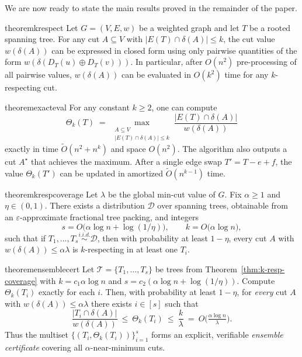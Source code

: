 \documentclass[11pt,letterpaper]{article}
\begin{document}
We are now ready to state the main results proved in the remainder of the paper.

\begin{restatable}{theorem}{krespect}
\label{thm:krespect}
Let $G=(V,E, w)$ be a weighted graph and let $T$ be a rooted spanning tree.  
For any cut $A \subseteq V$ with $|E(T)\cap \delta(A)| \le k$, the cut value
$w(\delta(A))$ can be expressed in closed form using only
pairwise quantities of the form $w(\delta(D_T(u)\oplus D_T(v)))$.
In particular, after $O(n^2)$ pre-processing of all pairwise values,
$w(\delta(A))$ can be evaluated in $O(k^2)$ time for any $k$-respecting cut.
\end{restatable}

\begin{restatable}{theorem}{exacteval}
\label{thm:exact-eval}
For any constant $k \ge 2$, one can compute
\[
\Theta_k(T) \;=\; \max_{\substack{A \subseteq V \\ |E(T)\cap \delta(A)| \le k}}
\frac{|E(T)\cap \delta(A)|}{w(\delta(A))}
\]
exactly in time $\tilde O(n^2+n^k)$ and space $O(n^2)$. 
The algorithm also outputs a cut $A^\star$ that achieves the maximum.
After a single edge swap $T' = T-e+f$, the value $\Theta_k(T')$ can be updated in amortized $\tilde O(n^{k-1})$ time.
\end{restatable}

\begin{restatable}{theorem}{krespcoverage}
\label{thm:k-resp-coverage}
Let $\lambda$ be the global min-cut value of $G$. 
Fix $\alpha \ge 1$ and $\eta \in (0,1)$. 
There exists a distribution $\mathcal{D}$ over spanning trees, 
obtainable from an $\varepsilon$-approximate fractional tree packing, 
and integers
\[
s = O\!\big(\alpha \log n + \log(1/\eta)\big),
\qquad
k = O\!\big(\alpha \log n\big),
\]
such that if $T_1,\dots,T_s \overset{i.i.d.}{\sim} \mathcal{D}$, 
then with probability at least $1-\eta$, 
every cut $A$ with $w(\delta(A)) \le \alpha \lambda$ is $k$-respecting 
in at least one $T_i$.
\end{restatable}

\begin{restatable}{theorem}{ensemblecert}
\label{thm:ensemble-cert}
Let $\mathcal{T}=\{T_1,\dots,T_s\}$ be trees from Theorem~\ref{thm:k-resp-coverage} with
$k=c_1\alpha\log n$ and $s=c_2(\alpha\log n+\log(1/\eta))$. 
Compute $\Theta_k(T_i)$ exactly for each $i$. 
Then, with probability at least $1-\eta$, for \emph{every} cut $A$ with $w(\delta(A))\le \alpha\lambda$
there exists $i\in[s]$ such that
\[
\frac{|T_i\cap\delta(A)|}{w(\delta(A))}\ \le\ \Theta_k(T_i)\ \le\ \frac{k}{\lambda}
\ =\ O\!\Big(\tfrac{\alpha\log n}{\lambda}\Big).
\]
Thus the multiset $\{(T_i,\Theta_k(T_i))\}_{i=1}^s$ forms an explicit, verifiable \emph{ensemble certificate}
covering all $\alpha$-near-minimum cuts.
\end{restatable}
\end{document}
